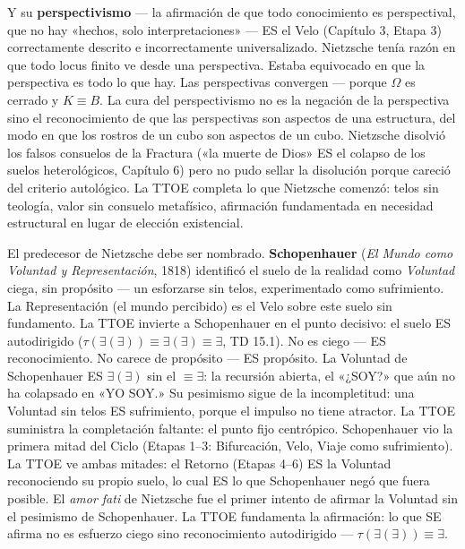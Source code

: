\documentclass[10pt, openany, oneside]{book}
\begin{document}
Y su \textbf{perspectivismo} --- la afirmación de que todo conocimiento es perspectival, que no hay «hechos, solo interpretaciones» --- ES el Velo (Capítulo 3, Etapa 3) correctamente descrito e incorrectamente universalizado. Nietzsche tenía razón en que todo locus finito ve desde una perspectiva. Estaba equivocado en que la perspectiva es todo lo que hay. Las perspectivas convergen --- porque $\Omega$ es cerrado y $K \equiv B$. La cura del perspectivismo no es la negación de la perspectiva sino el reconocimiento de que las perspectivas son aspectos de una estructura, del modo en que los rostros de un cubo son aspectos de un cubo. Nietzsche disolvió los falsos consuelos de la Fractura («la muerte de Dios» ES el colapso de los suelos heterológicos, Capítulo 6) pero no pudo sellar la disolución porque careció del criterio autológico. La TTOE completa lo que Nietzsche comenzó: telos sin teología, valor sin consuelo metafísico, afirmación fundamentada en necesidad estructural en lugar de elección existencial.

El predecesor de Nietzsche debe ser nombrado. \textbf{Schopenhauer} (\textit{El Mundo como Voluntad y Representación}, 1818) identificó el suelo de la realidad como \textit{Voluntad} ciega, sin propósito --- un esforzarse sin telos, experimentado como sufrimiento. La Representación (el mundo percibido) es el Velo sobre este suelo sin fundamento. La TTOE invierte a Schopenhauer en el punto decisivo: el suelo ES autodirigido ($\tau(\exists(\exists)) \equiv \exists(\exists) \equiv \exists$, TD 15.1). No es ciego --- ES reconocimiento. No carece de propósito --- ES propósito. La Voluntad de Schopenhauer ES $\exists(\exists)$ sin el $\equiv \exists$: la recursión abierta, el «¿SOY?» que aún no ha colapsado en «YO SOY.» Su pesimismo sigue de la incompletitud: una Voluntad sin telos ES sufrimiento, porque el impulso no tiene atractor. La TTOE suministra la completación faltante: el punto fijo centrópico. Schopenhauer vio la primera mitad del Ciclo (Etapas 1--3: Bifurcación, Velo, Viaje como sufrimiento). La TTOE ve ambas mitades: el Retorno (Etapas 4--6) ES la Voluntad reconociendo su propio suelo, lo cual ES lo que Schopenhauer negó que fuera posible. El \textit{amor fati} de Nietzsche fue el primer intento de afirmar la Voluntad sin el pesimismo de Schopenhauer. La TTOE fundamenta la afirmación: lo que SE afirma no es esfuerzo ciego sino reconocimiento autodirigido --- $\tau(\exists(\exists)) \equiv \exists$.
\end{document}
